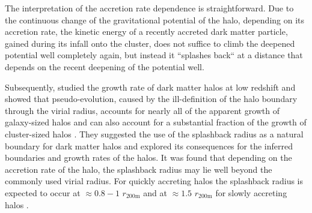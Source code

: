 \documentclass[iop, apjl, twocolappendix, numberedappendix]{emulateapj}
\begin{document}

The interpretation of the accretion rate dependence is
straightforward. Due to the continuous change of the gravitational
potential of the halo, depending on its accretion rate, the kinetic
energy of a recently accreted dark matter particle, gained during
its infall onto the cluster, does not suffice to climb the deepened
potential well completely again, but instead it ``splashes back`` at
a distance that depends on the recent deepening of the potential
well.

Subsequently, \citet{more2015splashback} studied the
growth rate of dark matter halos at low redshift and showed that
pseudo-evolution, caused by the ill-definition of the halo boundary
through the virial radius, accounts for nearly all of the apparent
growth of galaxy-sized halos and can also account for a substantial
fraction of the growth of cluster-sized halos
\citep{diemer2013pseudo}. They suggested the use of the splashback
radius as a natural boundary for dark matter halos and explored its
consequences for the inferred boundaries and growth rates of the
halos.  It was found that depending on the accretion rate of the
halo, the splashback radius may lie well beyond the commonly used
virial radius. For quickly accreting halos the splashback radius is
expected to occur at $\approx 0.8-1$ $r_{\mathrm{200m}}$ and at
$\approx 1.5$ $r_{\mathrm{200m}}$ for slowly accreting halos
\citep{more2015splashback}.
\end{document}

